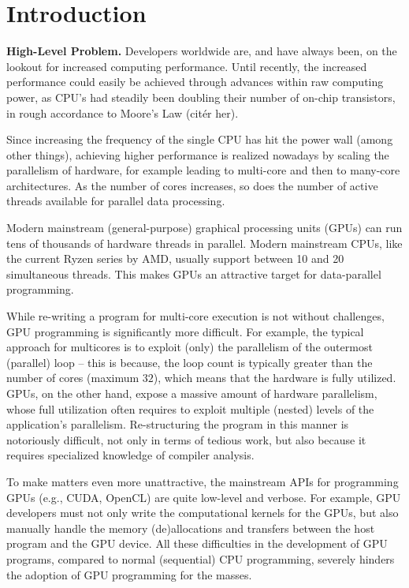 \chapter{Introduction}

{\bf High-Level Problem.} 
Developers worldwide are, and have always been, on the lookout 
for increased computing performance.
Until recently, the increased performance could easily be
achieved through advances within raw computing power, as CPU's had steadily been
doubling their number of on-chip transistors, in rough accordance to Moore's Law (citér
her).

Since increasing the frequency of the single CPU has hit the power
wall\cite{powerwall} (among other things), achieving higher performance 
is realized nowadays by scaling the parallelism of hardware, for example
leading to multi-core and then to many-core architectures.
As the number of cores increases, so does the number of
active threads available for parallel data processing.

Modern mainstream (general-purpose) graphical processing units (GPUs) can run 
tens of thousands of hardware threads in parallel. Modern mainstream CPUs, 
like the current Ryzen series by AMD, usually support between 10 and 20 
simultaneous threads. This makes GPUs an attractive target for data-parallel 
programming.

While re-writing a program for multi-core execution is not without challenges,
GPU programming is significantly more difficult. For example, the typical
approach for multicores is to exploit (only) the parallelism of the outermost
(parallel) loop -- this is because, the loop count is typically greater than 
the number of cores (maximum $32$), which means that the hardware
is fully utilized. GPUs, on the other hand, expose a massive amount of hardware
parallelism, whose full utilization often requires to exploit multiple (nested)
levels of the application's parallelism. Re-structuring the program in this
manner is notoriously difficult, not only in terms of tedious work, but also
because it requires specialized knowledge of compiler analysis.

To make matters even more unattractive, the mainstream APIs for programming
GPUs (e.g., CUDA, OpenCL) are quite low-level and verbose.  For example, GPU
developers must not only write the computational kernels for the GPUs, but 
also manually handle the memory (de)allocations and transfers between the host 
program and the GPU device.  All these difficulties in the development of GPU 
programs, compared to normal (sequential) CPU programming, severely hinders 
the adoption of GPU programming for the masses.

